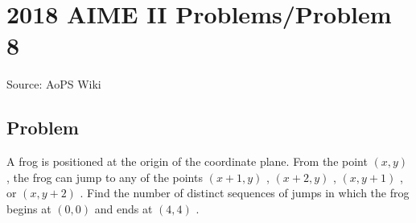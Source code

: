 \documentclass[12pt]{article}
\begin{document}
\section*{{2018 AIME II Problems/Problem 8}}
Source: AoPS Wiki

\subsection*{Problem}
A frog is positioned at the origin of the coordinate plane. From the point $(x, y)$ , the frog can jump to any of the points $(x + 1, y)$ , $(x + 2, y)$ , $(x, y + 1)$ , or $(x, y + 2)$ . Find the number of distinct sequences of jumps in which the frog begins at $(0, 0)$ and ends at $(4, 4)$ .
\end{document}
